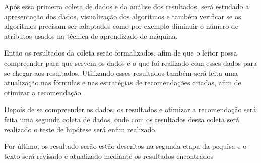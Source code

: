 Após essa primeira coleta de dados e da análise dos resultados, será
estudado a apresentação dos dados, visualização dos algoritmos e também
verificar se os algoritmos precisam ser adaptados como por exemplo
diminuir o número de atributos usados na técnica de aprendizado de máquina.

Então os resultados da coleta serão formalizados, afim de que o leitor
possa compreender para que servem os dados e o que foi realizado com esses
dados para se chegar aos resultados. Utilizando esses resultados também
será feita uma atualização nas fórmulas e nas estratégias de recomendações
criadas, afim de otimizar a recomendação.

Depois de se compreender os dados, os resultados e otimizar a recomendação
será feita uma segunda coleta de dados, onde com os resultados dessa coleta
será realizado o teste de hipótese será enfim realizado.

Por último, os resultado serão estão descritos na segunda etapa da pequisa e o
texto será revisado e atualizado mediante os resultados encontrados
